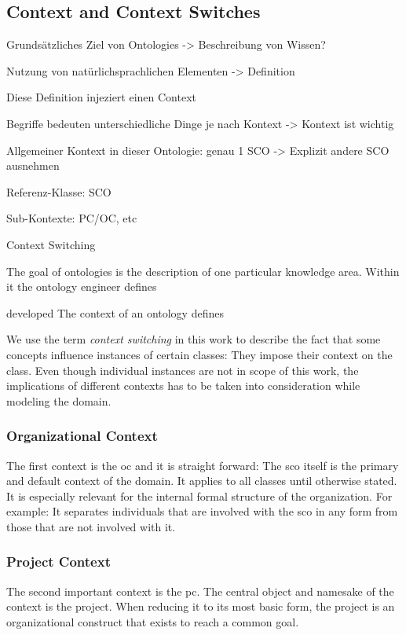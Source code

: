 \documentclass[a4paper, DIV=13, BCOR=0cm]{scrbook}
\begin{document}
\subsection{Context and Context Switches }
\begin{compactenum}
	\item Grundsätzliches Ziel von Ontologies -> Beschreibung von Wissen?
	\item Nutzung von natürlichsprachlichen Elementen -> Definition
	\item Diese Definition injeziert einen Context
	\item Begriffe bedeuten unterschiedliche Dinge je nach Kontext -> Kontext ist wichtig
	\item Allgemeiner Kontext in dieser Ontologie: genau 1 SCO -> Explizit andere SCO ausnehmen
	\item Referenz-Klasse: SCO
	\item Sub-Kontexte: PC/OC, etc
	\item Context Switching
\end{compactenum}

The goal of ontologies is the description of one particular knowledge area. Within it the ontology engineer defines

developed The context of an ontology defines

\label{context-switches}
We use the term \textit{context switching} in this work to describe the fact that some concepts influence instances of certain classes: They impose their context on the class. Even though individual instances are not in scope of this work, the implications of different contexts has to be taken into consideration while modeling the domain.

\subsubsection{Organizational Context}
\label{org-context}
The first context is the \gls{oc} and it is straight forward: The \gls{sco} itself is the primary and default context of the domain. It applies to all classes until otherwise stated. It is especially relevant for the internal formal structure of the organization. For example: It separates individuals that are involved with the \gls{sco} in any form from those that are not involved with it.

\subsubsection{Project Context}
\label{proj-context}
The second important context is the \gls{pc}. The central object and namesake of the context is the project. When reducing it to its most basic form, the project is an organizational construct that exists to reach a common goal.
\end{document}
